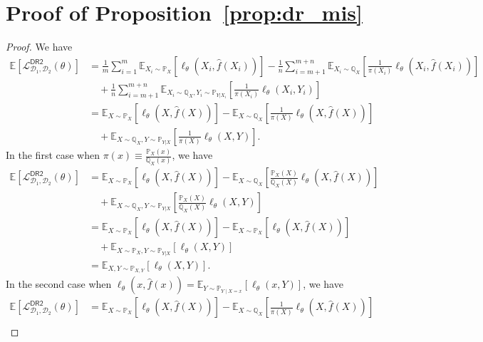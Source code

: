 \section{Proof of Proposition~\ref{prop:dr_mis}}\label{proof:dr_mis}
\begin{proof}
We have
\begin{align*}
\mathbb{E}[\mathcal{L}^{\mathsf{DR2}}_{\mathcal{D}_1,\mathcal{D}_2}(\theta) ]
& = \frac{1}{m}  \sum_{i=1}^{m} \mathbb{E}_{X_i\sim\mathbb{P}_X}[\ell_\theta(X_i, \hat f(X_i))] -  \frac{1}{n} \sum_{i=m+1}^{m+n}  \mathbb{E}_{X_i\sim\mathbb{Q}_X}\left[\frac{1}{\pi(X_i)}\ell_\theta(X_i, \hat f(X_i))\right] \\
& \quad  + \frac{1}{n}  \sum_{i=m+1}^{m+n} \mathbb{E}_{X_i\sim\mathbb{Q}_X, Y_i\sim \mathbb{P}_{Y|X_i}}\left[\frac{1}{\pi(X_i)}\ell_\theta(X_i, Y_i)\right] \\
& = \mathbb{E}_{X\sim\mathbb{P}_X}[\ell_\theta(X, \hat f(X))] - \mathbb{E}_{X\sim\mathbb{Q}_X}\left[\frac{1}{\pi(X)}\ell_\theta(X, \hat f(X))\right] \\
& \quad  +  \mathbb{E}_{X\sim\mathbb{Q}_X, Y\sim \mathbb{P}_{Y|X}}\left[\frac{1}{\pi(X)}\ell_\theta(X, Y)\right].
\end{align*}
In the first case when $\pi(x) \equiv \frac{\mathbb{P}_X(x)}{\mathbb{Q}_X(x)}$, we have
\begin{align*}
\mathbb{E}[\mathcal{L}^{\mathsf{DR2}}_{\mathcal{D}_1,\mathcal{D}_2}(\theta) ]
& = \mathbb{E}_{X\sim\mathbb{P}_X}[\ell_\theta(X, \hat f(X))] - \mathbb{E}_{X\sim\mathbb{Q}_X}\left[\frac{\mathbb{P}_X(X)}{\mathbb{Q}_X(X)}\ell_\theta(X, \hat f(X))\right] \\
& \quad  +  \mathbb{E}_{X\sim\mathbb{Q}_X, Y\sim \mathbb{P}_{Y|X}}\left[\frac{\mathbb{P}_X(X)}{\mathbb{Q}_X(X)}\ell_\theta(X, Y)\right] \\
& = \mathbb{E}_{X\sim\mathbb{P}_X}[\ell_\theta(X, \hat f(X))] - \mathbb{E}_{X\sim\mathbb{P}_X}\left[\ell_\theta(X, \hat f(X))\right] \\
& \quad  +  \mathbb{E}_{X\sim\mathbb{P}_X, Y\sim \mathbb{P}_{Y|X}}\left[\ell_\theta(X, Y)\right] \\
& = \mathbb{E}_{X, Y\sim\mathbb{P}_{X, Y}}\left[\ell_\theta(X, Y)\right].
\end{align*}
In the second case when $\ell_\theta(x, \hat f(x))  = \mathbb{E}_{ Y\sim \mathbb{P}_{Y\mid X=x}}[\ell_\theta(x, Y)]$, we have
\begin{align*}
\mathbb{E}[\mathcal{L}^{\mathsf{DR2}}_{\mathcal{D}_1,\mathcal{D}_2}(\theta) ]
& = \mathbb{E}_{X\sim\mathbb{P}_X}[\ell_\theta(X, \hat f(X))] - \mathbb{E}_{X\sim\mathbb{Q}_X}\left[\frac{1}{\pi(X)}\ell_\theta(X, \hat f(X))\right] \\

\end{align*}
\end{proof}

